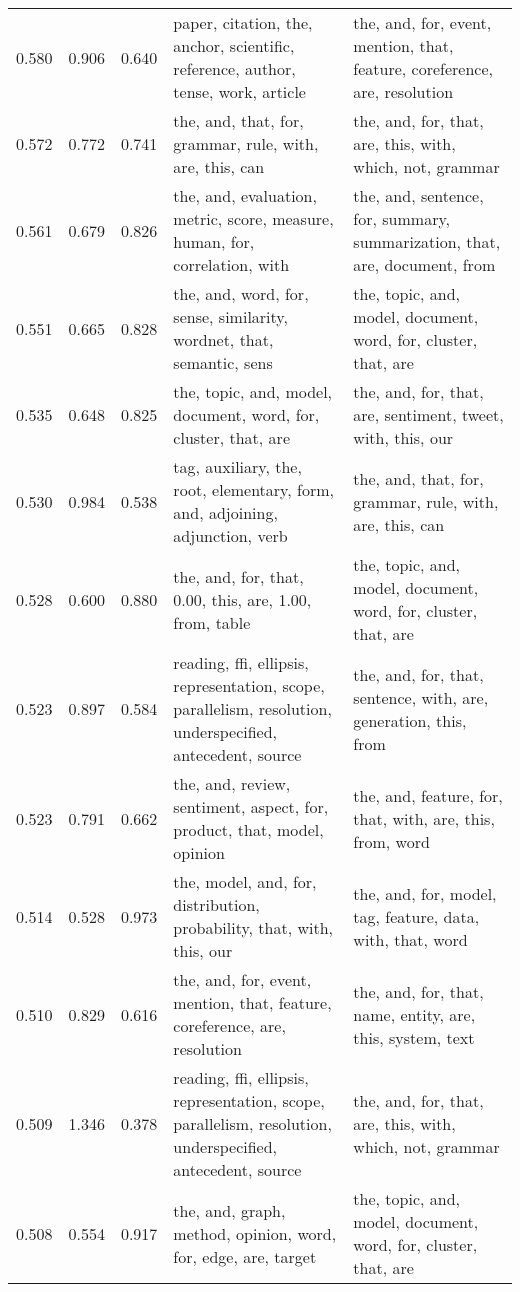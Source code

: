 \begin{tabular}{cccp{5cm}p{5cm}}
0.580 & 0.906 & 0.640 & paper, citation, the, anchor, scientific, reference, author, tense, work, article & the, and, for, event, mention, that, feature, coreference, are, resolution \\
0.572 & 0.772 & 0.741 & the, and, that, for, grammar, rule, with, are, this, can & the, and, for, that, are, this, with, which, not, grammar \\
0.561 & 0.679 & 0.826 & the, and, evaluation, metric, score, measure, human, for, correlation, with & the, and, sentence, for, summary, summarization, that, are, document, from \\
0.551 & 0.665 & 0.828 & the, and, word, for, sense, similarity, wordnet, that, semantic, sens & the, topic, and, model, document, word, for, cluster, that, are \\
0.535 & 0.648 & 0.825 & the, topic, and, model, document, word, for, cluster, that, are & the, and, for, that, are, sentiment, tweet, with, this, our \\
0.530 & 0.984 & 0.538 & tag, auxiliary, the, root, elementary, form, and, adjoining, adjunction, verb & the, and, that, for, grammar, rule, with, are, this, can \\
0.528 & 0.600 & 0.880 & the, and, for, that, 0.00, this, are, 1.00, from, table & the, topic, and, model, document, word, for, cluster, that, are \\
0.523 & 0.897 & 0.584 & reading, ffi, ellipsis, representation, scope, parallelism, resolution, underspecified, antecedent, source & the, and, for, that, sentence, with, are, generation, this, from \\
0.523 & 0.791 & 0.662 & the, and, review, sentiment, aspect, for, product, that, model, opinion & the, and, feature, for, that, with, are, this, from, word \\
0.514 & 0.528 & 0.973 & the, model, and, for, distribution, probability, that, with, this, our & the, and, for, model, tag, feature, data, with, that, word \\
0.510 & 0.829 & 0.616 & the, and, for, event, mention, that, feature, coreference, are, resolution & the, and, for, that, name, entity, are, this, system, text \\
0.509 & 1.346 & 0.378 & reading, ffi, ellipsis, representation, scope, parallelism, resolution, underspecified, antecedent, source & the, and, for, that, are, this, with, which, not, grammar \\
0.508 & 0.554 & 0.917 & the, and, graph, method, opinion, word, for, edge, are, target & the, topic, and, model, document, word, for, cluster, that, are \\

\end{tabular}

